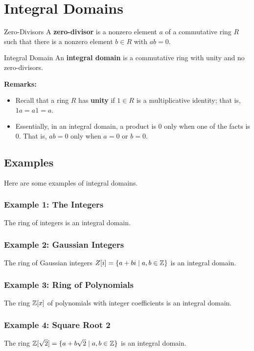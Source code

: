 \documentclass[letterpaper]{article}
\begin{document}
\section{Integral Domains}
\begin{definition}{Zero-Divisors}{}
    A \textbf{zero-divisor} is a nonzero element $a$ of a commutative ring $R$ such that there is a nonzero element $b \in R$ with $ab = 0$. 
\end{definition}

\begin{definition}{Integral Domain}{}
    An \textbf{integral domain} is a commutative ring with unity and no zero-divisors.
\end{definition}
\textbf{Remarks:}
\begin{itemize}
    \item Recall that a ring $R$ has \textbf{unity} if $1 \in R$ is a multiplicative identity; that is, $1a = a1 = a$. 
    \item Essentially, in an integral domain, a product is 0 only when one of the facts is 0. That is, $ab = 0$ only when $a = 0$ or $b = 0$. 
\end{itemize}

\subsection{Examples}
Here are some examples of integral domains. 

\subsubsection{Example 1: The Integers}
The ring of integers is an integral domain. 

\subsubsection{Example 2: Gaussian Integers}
The ring of Gaussian integers $Z[i] = \{a + bi \mid a, b \in \mathbb{Z}\}$ is an integral domain. 

\subsubsection{Example 3: Ring of Polynomials}
The ring $\mathbb{Z}[x]$ of polynomials with integer coefficients is an integral domain. 

\subsubsection{Example 4: Square Root 2}
The ring $\mathbb{Z}[\sqrt{2}] = \{a + b\sqrt{2} \mid a, b \in \mathbb{Z}\}$ is an integral domain. 
\end{document}
